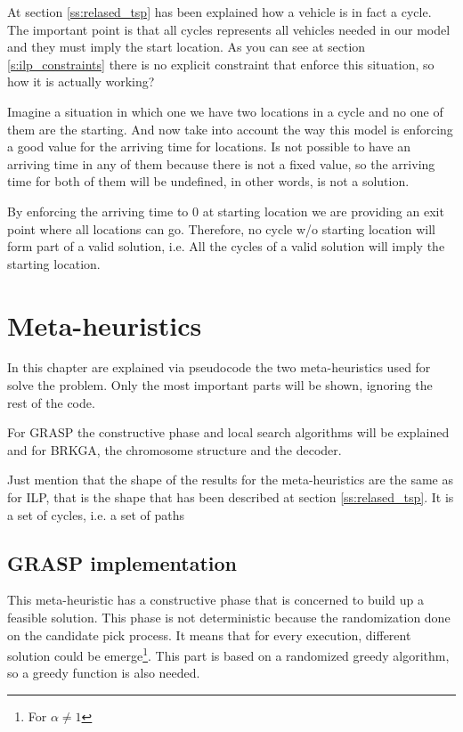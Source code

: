 \documentclass[]{report}
\begin{document}
At section \ref{ss:relased_tsp} has been explained how a vehicle is in fact a cycle. The important point is that all cycles represents all vehicles needed in our model and they must imply the start location. As you can see at section \ref{s:ilp_constraints} there is no explicit constraint that enforce this situation, so how it is actually  working?

Imagine a situation in which one we have two locations in a cycle and no one of them are the starting. And now take into account the way this model is enforcing a good value for the arriving time for locations. Is not possible to have an arriving time in any of them because there is not a fixed value, so the arriving time for both of them will be undefined, in other words, is not a solution.

By enforcing the arriving time to $0$ at starting location we are providing an exit point where all locations can go. Therefore, no cycle w/o starting location will form part of a valid solution, i.e. All the cycles of a valid solution will imply the starting location.

\chapter{Meta-heuristics}\label{ch:meta_heuristics}

In this chapter are explained via pseudocode the two meta-heuristics used for solve the problem. Only the most important parts will be shown, ignoring the rest of the code.

For GRASP the constructive phase and local search algorithms will be explained and for BRKGA, the chromosome structure and the decoder.

Just mention that the shape of the results for the meta-heuristics are the same as for ILP, that is the shape that has been described at section \ref{ss:relased_tsp}. It is a set of cycles, i.e. a set of paths

\section{GRASP implementation}

This meta-heuristic has a constructive phase that is concerned to build up a feasible solution. This phase is not deterministic because the randomization done on the candidate pick process. It means that for every execution, different solution could be emerge\footnote{For $\alpha \neq 1$}. This part is based on a randomized greedy algorithm, so a greedy function is also needed.
\end{document}
